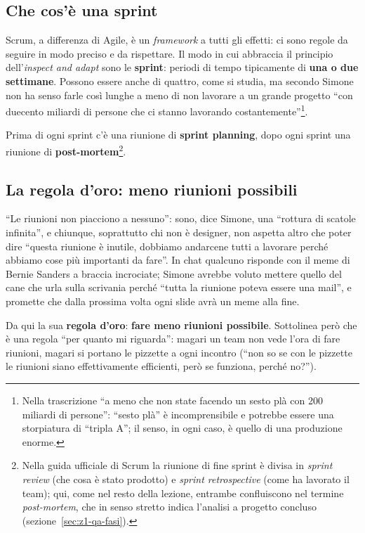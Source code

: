 \subsection{Che cos'è una sprint}

Scrum, a differenza di Agile, è un \emph{framework} a tutti gli effetti: ci
sono regole da seguire in modo preciso e da rispettare. Il modo in cui
abbraccia il principio dell'\emph{inspect and adapt} sono le
\textbf{sprint}: periodi di tempo tipicamente di \textbf{una o due
settimane}. Possono essere anche di quattro, come si studia, ma secondo Simone
non ha senso farle così lunghe a meno di non lavorare a un grande progetto
``con duecento miliardi di persone che ci stanno lavorando
costantemente''\footnote{Nella trascrizione ``a meno che non state facendo un
sesto plà con 200 miliardi di persone'': ``sesto plà'' è incomprensibile e
potrebbe essere una storpiatura di ``tripla A''; il senso, in ogni caso, è
quello di una produzione enorme.}.

Prima di ogni sprint c'è una riunione di \textbf{sprint planning}, dopo ogni
sprint una riunione di \textbf{post-mortem}\footnote{Nella guida ufficiale di
Scrum la riunione di fine sprint è divisa in \emph{sprint review} (che cosa è
stato prodotto) e \emph{sprint retrospective} (come ha lavorato il team);
qui, come nel resto della lezione, entrambe confluiscono nel termine
\emph{post-mortem}, che in senso stretto indica l'analisi a progetto
concluso (sezione~\ref{sec:z1-qa-fasi}).}.

\subsection{La regola d'oro: meno riunioni possibili}

``Le riunioni non piacciono a nessuno'': sono, dice Simone, una ``rottura di
scatole infinita'', e chiunque, soprattutto chi non è designer, non aspetta
altro che poter dire ``questa riunione è inutile, dobbiamo andarcene tutti a
lavorare perché abbiamo cose più importanti da fare''. In chat qualcuno
risponde con il meme di Bernie Sanders a braccia incrociate; Simone avrebbe
voluto mettere quello del cane che urla sulla scrivania perché ``tutta la
riunione poteva essere una mail'', e promette che dalla prossima volta ogni
slide avrà un meme alla fine.

Da qui la sua \textbf{regola d'oro}: \textbf{fare meno riunioni possibile}.
Sottolinea però che è una regola ``per quanto mi riguarda'': magari un team
non vede l'ora di fare riunioni, magari si portano le pizzette a ogni
incontro (``non so se con le pizzette le riunioni siano effettivamente
efficienti, però se funziona, perché no?'').

